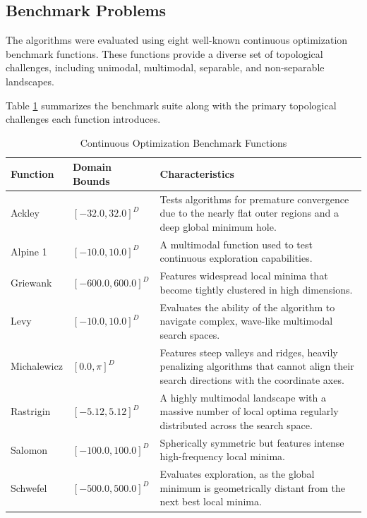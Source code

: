 \documentclass[conference]{IEEEtran}
\begin{document}
\subsection{Benchmark Problems}
The algorithms were evaluated using eight well-known continuous optimization benchmark functions. These functions 
provide a diverse set of topological challenges, including unimodal, multimodal, separable, and 
non-separable landscapes. 

Table \ref{tab:benchmarks} summarizes the benchmark suite along with the primary topological challenges each function introduces.

\begin{table}[htbp]
    \caption{Continuous Optimization Benchmark Functions}
    \label{tab:benchmarks}
    \centering
    \begin{tabular}{p{} p{} p{}}
        \toprule
        \textbf{Function} & \textbf{Domain Bounds} & \textbf{Characteristics} \\
        \midrule
    Ackley & $[-32.0, 32.0]^D$ & Tests algorithms for premature convergence due to the nearly flat outer regions and a deep global minimum hole. \\
        Alpine 1 & $[-10.0, 10.0]^D$ & A multimodal function used to test continuous exploration capabilities. \\
        Griewank & $[-600.0, 600.0]^D$ & Features widespread local minima that become tightly clustered in high dimensions. \\
        Levy & $[-10.0, 10.0]^D$ & Evaluates the ability of the algorithm to navigate complex, wave-like multimodal search spaces. \\
        Michalewicz & $[0.0, \pi]^D$ & Features steep valleys and ridges, heavily penalizing algorithms that cannot align their search directions with the coordinate axes. \\
        Rastrigin & $[-5.12, 5.12]^D$ & A highly multimodal landscape with a massive number of local optima regularly distributed across the search space. \\
        Salomon & $[-100.0, 100.0]^D$ & Spherically symmetric but features intense high-frequency local minima. \\
        Schwefel & $[-500.0, 500.0]^D$ & Evaluates exploration, as the global minimum is geometrically distant from the next best local minima. \\
        \bottomrule
    \end{tabular}
\end{table}
\end{document}
